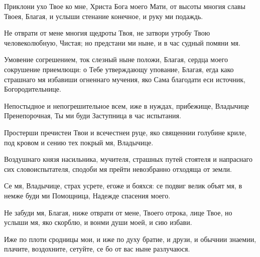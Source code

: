 \begin{mymulticols}
\slavan

Приклони ухо Твое ко мне, Христа Бога моего Мати, от высоты многия славы Твоея, Благая, и услыши стенание конечное, и руку ми подаждь. 

\inynen

Не отврати от мене многия щедроты Твоя, не затвори утробу Твою человеколюбную, Чистая; но предстани ми ныне, и в час судный помяни мя.




Умовение согрешением, ток слезный ныне положи, Благая, сердца моего сокрушение приемлющи: о Тебе утверждающу упование, Благая, егда како страшнаго мя избавиши огненнаго мучения, яко Сама благодати еси источник, Богородительнице. 


Непостыдное и непогрешительное всем, иже в нуждах, прибежище, Владычице Пренепорочная, Ты ми буди Заступница в час испытания. 


Простерши пречистеи Твои и всечестнеи руце, яко священнии голубине криле, под кровом и сению тех покрый мя, Владычице. 

\slavan

Воздушнаго князя насильника, мучителя, страшных путей стоятеля и напраснаго сих словоиспытателя, сподоби мя прейти невозбранно отходяща от земли. 

\inynen

Се мя, Владычице, страх усрете, егоже и бояхся: се подвиг велик объят мя, в немже буди ми Помощница, Надежде спасения моего.




Не забуди мя, Благая, ниже отврати от мене, Твоего отрока, лице Твое, но услыши мя, яко скорблю, и вонми души моей, и сию избави. 


Иже по плоти сродницы мои, и иже по духу братие, и друзи, и обычнии знаемии, плачите, воздохните, сетуйте, се бо от вас ныне разлучаюся. 


\end{mymulticols}
